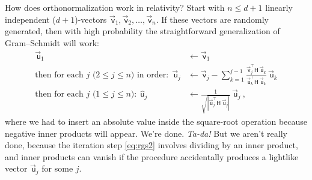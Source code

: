 \documentclass{article}
\newcommand{\metric}{\mathsf{H}}
\newcommand\upvec[1]{\!\vec{\,\mathrm{#1}}}
\newcommand{\Lvec}[1]{\upvec{\mathsf{#1}}} %
\newcommand{\Lhat}[1]{\hat{\mathsf{#1}}} %
\newcommand{\plus}{\!+\!} %
\begin{document}
How does orthonormalization work in relativity?
Start with $n\leq d+1$ linearly independent ($d\plus1$)-vectors $\Lvec{v}_1,\Lvec{v}_2,\ldots,\Lvec{v}_n$.
If these vectors are randomly generated, then with high probability the straightforward generalization of Gram--Schmidt will work:
\begin{align}
    \Lvec{u}_1 &\leftarrow \Lvec{v}_1 \label{eq:rgs1}
    \\
    \mbox{then for each $j$ ($2\leq j\leq n$) in order:} ~~ \Lvec{u}_j &\leftarrow \Lvec{v}_j - \sum_{k=1}^{j-1} \frac{\Lvec{v}_j^\top\metric\,\Lvec{u}_k}{\Lvec{u}_k^\top\metric\,\Lvec{u}_k}\,\Lvec{u}_k \label{eq:rgs2}
    \\
    \mbox{then for each $j$ ($1\leq j\leq n$):} ~~ \Lhat{u}_j &\leftarrow \frac{1}{\sqrt{|\Lvec{u}_j^\top\metric\,\Lvec{u}_j|}}\,\Lvec{u}_j ~, \label{eq:rgs3}
\end{align}
where we had to insert an absolute value inside the square-root operation because negative inner products will appear.
We're done. \emph{Ta-da!}
But we aren't really done, because the iteration step \eqref{eq:rgs2} involves dividing by an inner product, and inner products can vanish if the procedure accidentally produces a lightlike vector $\Lvec{u}_j$ for some $j$.
\end{document}

